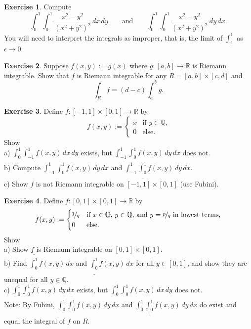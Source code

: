 \documentclass[12pt]{book}
\newcommand{\R}{{\mathbb{R}}}
\newcommand{\Q}{{\mathbb{Q}}}
\theoremstyle{plain}
\theoremstyle{remark}
\theoremstyle{definition}
\theoremstyle{exercise}
\newtheorem{exercise}{Exercise}[section]
\theoremstyle{example}
\begin{document}
\begin{exercise}
Compute
\begin{equation*}
\int_0^1 \int_0^1 \frac{x^2-y^2}{{(x^2+y^2)}^2} \, dx \, dy
\qquad \text{and} \qquad
\int_0^1 \int_0^1 \frac{x^2-y^2}{{(x^2+y^2)}^2} \, dy \, dx .
\end{equation*}
You will need to interpret the integrals as improper, that
is, the limit of $\int_\epsilon^1$ as $\epsilon \to 0$.
\end{exercise}

\begin{exercise}
Suppose $f(x,y) := g(x)$ where $g \colon [a,b] \to \R$ is Riemann integrable.
Show that $f$ is Riemann integrable for any $R = [a,b] \times [c,d]$ and 
\begin{equation*}
\int_R f = (d-c) \int_a^b g .
\end{equation*}
\end{exercise}

\begin{exercise}
Define $f \colon [-1,1] \times [0,1] \to \R$ by
\begin{equation*}
f(x,y) :=
\begin{cases}
x & \text{if $y \in \Q$,} \\
0 & \text{else.} 
\end{cases}
\end{equation*}
Show\\
a) $\int_0^1 \int_{-1}^1 f(x,y) \, dx \, dy$ exists, but
$\int_{-1}^1 \int_0^1 f(x,y) \, dy \, dx$ does not.\\
b) Compute
$\int_{-1}^1 \overline{\int_0^1} f(x,y) \, dy \, dx$ and
$\int_{-1}^1 \underline{\int_0^1} f(x,y) \, dy \, dx$.\\
c) Show $f$ is not Riemann integrable on $[-1,1] \times [0,1]$ (use
Fubini).
\end{exercise}

\begin{exercise}
Define $f \colon [0,1] \times [0,1] \to \R$ by
\begin{equation*}
f(x,y) :=
\begin{cases}
\nicefrac{1}{q} & \text{if $x \in \Q$, $y \in \Q$, and $y=\nicefrac{p}{q}$ in lowest terms,} \\
0 & \text{else.} 
\end{cases}
\end{equation*}
Show\\
a) Show $f$ is Riemann integrable on $[0,1] \times [0,1]$.\\
b) Find 
$\overline{\int_0^1} f(x,y) \, dx$ and
$\underline{\int_0^1} f(x,y) \, dx$ for all $y \in [0,1]$, and show they are unequal for all $y
\in \Q$.\\
c) $\int_0^1 \int_0^1 f(x,y) \, dy \, dx$ exists, but
   $\int_0^1 \int_0^1 f(x,y) \, dx \, dy$ does not.\\
Note: By Fubini,
$\int_0^1 \overline{\int_0^1} f(x,y) \, dy \, dx$ and 
$\int_0^1 \underline{\int_0^1} f(x,y) \, dy \, dx$ do exist and equal the
integral of $f$ on $R$.
\end{exercise}
\end{document}

